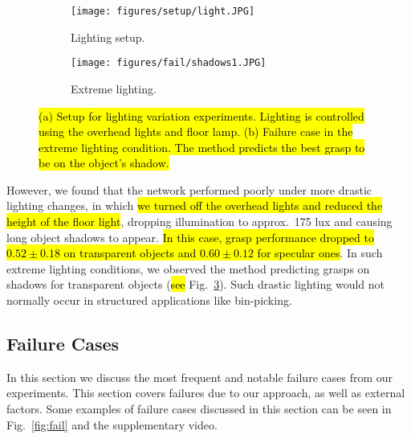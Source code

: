 \begin{figure}[h]
    \centering
    \begin{subfigure}[b]{0.49\columnwidth}
        \centering
        \texttt{[image: figures/setup/light.JPG]}
        \caption{Lighting setup.}
        \label{fig:lighting1}
    \end{subfigure}
    \begin{subfigure}[b]{0.49\columnwidth}
        \centering
        \texttt{[image: figures/fail/shadows1.JPG]}
        \caption{Extreme lighting.}
        \label{fig:lighting2}
    \end{subfigure}
    \caption{\hl{(a) Setup for lighting variation experiments. Lighting is controlled using the overhead lights and floor lamp. (b) Failure case in the extreme lighting condition. The method predicts the best grasp to be on the object's shadow.
    }}
\end{figure}


However, we found that the network performed poorly under more drastic lighting changes, in which \hl{we turned off the overhead lights and reduced the height of  the floor light}, dropping illumination to approx.\ 175 lux and causing long object shadows to appear.  
\hl{In this case, grasp performance dropped to $0.52\pm0.18$ on transparent objects and $0.60\pm0.12$ for specular ones}. %
In such extreme lighting conditions, we observed the method predicting grasps on shadows for transparent objects (\hl{see }Fig.~\ref{fig:lighting2}). Such drastic lighting would not normally occur in structured applications like bin-picking.

\subsection{Failure Cases}

In this section we discuss the most frequent and notable failure cases from our experiments. 
This section covers failures due to our approach, as well as external factors.
Some examples of failure cases discussed in this section can be seen in Fig.~\ref{fig:fail} and the supplementary video. 

